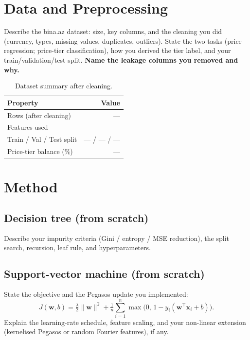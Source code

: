 \documentclass[10pt,twocolumn,a4paper]{article}
\begin{document}
\section{Data and Preprocessing}
Describe the bina.az dataset: size, key columns, and the cleaning you
did (currency, types, missing values, duplicates, outliers). State the
two tasks (price regression; price-tier classification), how you derived
the tier label, and your train/validation/test split. \textbf{Name the
leakage columns you removed and why.}

\begin{table}[t]
  \centering
  \caption{Dataset summary after cleaning.}
  \label{tab:data}
  \begin{tabular}{@{}lr@{}}
    \toprule
    Property & Value \\
    \midrule
    Rows (after cleaning)       & --- \\
    Features used               & --- \\
    Train / Val / Test split    & --- / --- / --- \\
    Price-tier balance (\%)     & --- \\
    \bottomrule
  \end{tabular}
\end{table}

\section{Method}
\subsection{Decision tree (from scratch)}
Describe your impurity criteria (Gini / entropy / MSE reduction), the
split search, recursion, leaf rule, and hyperparameters.

\subsection{Support-vector machine (from scratch)}
State the objective and the Pegasos update you implemented:
\begin{equation}
  J(\mathbf{w},b)=\tfrac{\lambda}{2}\lVert\mathbf{w}\rVert^{2}
  +\tfrac{1}{n}\sum_{i=1}^{n}\max\!\big(0,\,1-y_i(\mathbf{w}^{\top}\mathbf{x}_i+b)\big).
\end{equation}
Explain the learning-rate schedule, feature scaling, and your non-linear
extension (kernelised Pegasos or random Fourier features), if any.
\end{document}
